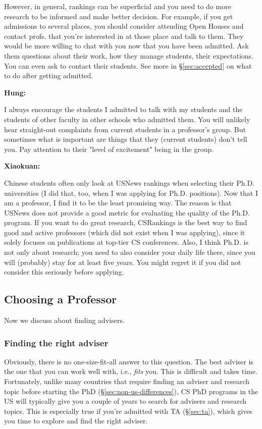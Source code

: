 \documentclass[11pt]{article}
\newenvironment{commentbox}[1][]{
\small
    \begin{mybox}
    {\small \textbf{#1}}
 }{
   \end{mybox}
}
\begin{document}
However, in general, rankings can be superficial and you need to do more research to be informed and make better decision. For example, if you get admissions to several places, you should consider attending Open Houses and contact profs. that you're interested in at those place and talk to them. They would be more willing to chat with you now that you have been admitted.  Ask them questions about their work, how they manage students, their expectations. You can even ask to contact their students. See more in \S\ref{sec:accepted} on what to do after getting admitted.


\begin{commentbox}[Hung:]
I always encourage the students I admitted to talk with my students and the students of other faculty in other schools who admitted them. You will unlikely hear straight-out complaints from current students in a professor’s group. But sometimes what is important are things that they (current students) don’t tell you. Pay attention to their "level of excitement" being in the group.
\end{commentbox}

\begin{commentbox}[Xiaokuan:]
Chinese students often only look at USNews rankings when selecting their Ph.D. universities (I did that, too, when I was applying for Ph.D. positions).
Now that I am a professor, I find it to be the least promising way.
%
The reason is that USNews does not provide a good metric for evaluating the quality of the Ph.D. program.
%
If you want to do great research, CSRankings is the best way to find good and active professors (which did not exist when I was applying),
since it solely focuses on publications at top-tier CS conferences.
%
Also, 
I think Ph.D. is not only about research; 
you need to also consider your daily life there, since you will (probably) stay for at least five years.
%
You might regret it if you did not consider this seriously before applying.
%
\end{commentbox}


\subsection{Choosing a Professor}

Now we discuss about finding advisers.

\subsubsection{Finding the right adviser}
Obviously, there is no one-size-fit-all answer to this question. The best adviser is the one that you can work well with, i.e., \emph{fits} you.  This is difficult and takes time.  Fortunately, unlike many countries that require finding an adviser and research topic before starting the PhD (\S\ref{sec:non-us-differences}), CS PhD programs in the US will typically give you a couple of years to search for advisers and research topics.  This is especially true if you're admitted with TA (\S\ref{sec:ta}), which gives you time to explore and find the right adviser. 
\end{document}
